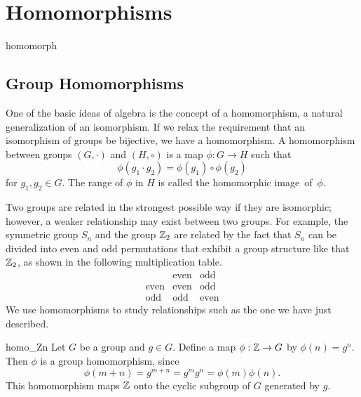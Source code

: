 \chapter{Homomorphisms}{homomorph}

 
\section{Group Homomorphisms}
 
 
One of the basic ideas of algebra is the concept of a homomorphism, a
natural generalization of an isomorphism. If we relax the requirement
that an isomorphism of groups be bijective, we have a homomorphism.  A
{\bfi homomorphism\/} between groups $(G, \cdot)$ and $(H, \circ)$ is a map $\phi :
G \rightarrow H$ such that  
$$
\phi( g_1 \cdot g_2 ) = \phi( g_1 ) \circ \phi( g_2 )
$$
for $g_1, g_2 \in G$. The range of $\phi$ in $H$ is called the {\bfi
homomorphic image\/}~of~$\phi$.
 
 
Two groups are related in the strongest possible way if they are
isomorphic; however, a weaker relationship may exist between two
groups.  For example, the symmetric group $S_n$ and the group ${\Bbb
Z}_2$ are related by the fact that $S_n$ can be divided into even and
odd permutations that exhibit a group structure like that ${\Bbb
Z}_2$, as shown in the following multiplication table. 
$$
\begin{array}{c|cc}
            & \mbox{even} & \mbox{odd} \\
\hline
\mbox{even} & \mbox{even} & \mbox{odd} \\
\mbox{odd}  & \mbox{odd}  & \mbox{even}
\end{array}
$$
We use homomorphisms to study relationships such as the one we have
just described.
 
 
\begin{example}{homo_Zn}
Let $G$ be a group and $g \in G$. Define a map $\phi : {\Bbb Z}
\rightarrow G$ by $\phi( n ) = g^n$. Then $\phi$ is a group
homomorphism, since 
$$
\phi( m + n ) = g^{ m + n} = g^m g^n = \phi( m ) \phi( n ).
$$
This homomorphism maps ${\Bbb Z}$ onto the cyclic subgroup of $G$
generated by $g$. 
\mbox{\hspace*{1in}}
\end{example}
 

